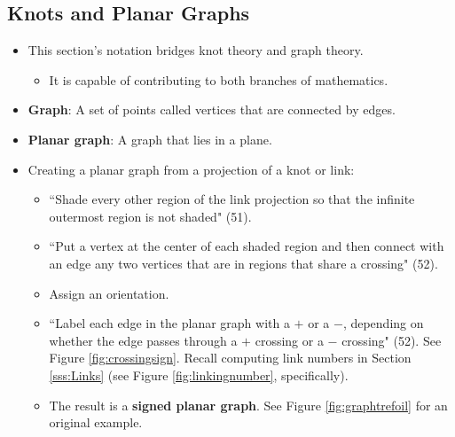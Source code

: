 \documentclass[titlepage]{article}
\numberwithin{figure}{section}
\numberwithin{table}{section}
\numberwithin{equation}{section}
\newcommand{\dq}[2]{``#1" (#2).}
\begin{document}
\subsection{Knots and Planar Graphs}
\begin{itemize}
    \item This section's notation bridges knot theory and graph theory.
    \begin{itemize}
        \item It is capable of contributing to both branches of mathematics.
    \end{itemize}
    \item \textbf{Graph}: A set of points called vertices that are connected by edges.
    \item \textbf{Planar graph}: A graph that lies in a plane.
    \item Creating a planar graph from a projection of a knot or link:
    \begin{itemize}
        \item \dq{Shade every other region of the link projection so that the infinite outermost region is not shaded}{51}
        \item \dq{Put a vertex at the center of each shaded region and then connect with an edge any two vertices that are in regions that share a crossing}{52}
        \item Assign an orientation.
        \item \dq{Label each edge in the planar graph with a $+$ or a $-$, depending on whether the edge passes through a $+$ crossing or a $-$ crossing}{52} See Figure \ref{fig:crossingsign}. Recall computing link numbers in Section \ref{sss:Links} (see Figure \ref{fig:linkingnumber}, specifically).
        \item The result is a \textbf{signed planar graph}. See Figure \ref{fig:graphtrefoil} for an original example.
    \end{itemize}
    \begin{figure}[h!]
        \centering
        \begin{subfigure}[b]{0.2\linewidth}
            \centering
\end{subfigure}
\end{figure}
\end{itemize}
\end{document}

